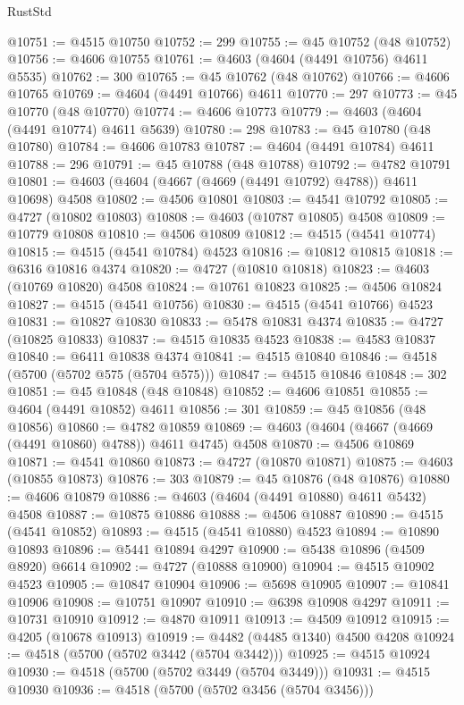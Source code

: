 \begin{lexlean}{RustStd}
\begin{coremodule}
@10751 := @4515 @10750
@10752 := 299
@10755 := @45 @10752 (@48 @10752)
@10756 := @4606 @10755
@10761 := @4603 (@4604 (@4491 @10756) @4611 @5535)
@10762 := 300
@10765 := @45 @10762 (@48 @10762)
@10766 := @4606 @10765
@10769 := @4604 (@4491 @10766) @4611
@10770 := 297
@10773 := @45 @10770 (@48 @10770)
@10774 := @4606 @10773
@10779 := @4603 (@4604 (@4491 @10774) @4611 @5639)
@10780 := 298
@10783 := @45 @10780 (@48 @10780)
@10784 := @4606 @10783
@10787 := @4604 (@4491 @10784) @4611
@10788 := 296
@10791 := @45 @10788 (@48 @10788)
@10792 := @4782 @10791
@10801 := @4603 (@4604 (@4667 (@4669 (@4491 @10792) @4788)) @4611 @10698) @4508
@10802 := @4506 @10801
@10803 := @4541 @10792
@10805 := @4727 (@10802 @10803)
@10808 := @4603 (@10787 @10805) @4508
@10809 := @10779 @10808
@10810 := @4506 @10809
@10812 := @4515 (@4541 @10774)
@10815 := @4515 (@4541 @10784) @4523
@10816 := @10812 @10815
@10818 := @6316 @10816 @4374
@10820 := @4727 (@10810 @10818)
@10823 := @4603 (@10769 @10820) @4508
@10824 := @10761 @10823
@10825 := @4506 @10824
@10827 := @4515 (@4541 @10756)
@10830 := @4515 (@4541 @10766) @4523
@10831 := @10827 @10830
@10833 := @5478 @10831 @4374
@10835 := @4727 (@10825 @10833)
@10837 := @4515 @10835 @4523
@10838 := @4583 @10837
@10840 := @6411 @10838 @4374
@10841 := @4515 @10840
@10846 := @4518 (@5700 (@5702 @575 (@5704 @575)))
@10847 := @4515 @10846
@10848 := 302
@10851 := @45 @10848 (@48 @10848)
@10852 := @4606 @10851
@10855 := @4604 (@4491 @10852) @4611
@10856 := 301
@10859 := @45 @10856 (@48 @10856)
@10860 := @4782 @10859
@10869 := @4603 (@4604 (@4667 (@4669 (@4491 @10860) @4788)) @4611 @4745) @4508
@10870 := @4506 @10869
@10871 := @4541 @10860
@10873 := @4727 (@10870 @10871)
@10875 := @4603 (@10855 @10873)
@10876 := 303
@10879 := @45 @10876 (@48 @10876)
@10880 := @4606 @10879
@10886 := @4603 (@4604 (@4491 @10880) @4611 @5432) @4508
@10887 := @10875 @10886
@10888 := @4506 @10887
@10890 := @4515 (@4541 @10852)
@10893 := @4515 (@4541 @10880) @4523
@10894 := @10890 @10893
@10896 := @5441 @10894 @4297
@10900 := @5438 @10896 (@4509 @8920) @6614
@10902 := @4727 (@10888 @10900)
@10904 := @4515 @10902 @4523
@10905 := @10847 @10904
@10906 := @5698 @10905
@10907 := @10841 @10906
@10908 := @10751 @10907
@10910 := @6398 @10908 @4297
@10911 := @10731 @10910
@10912 := @4870 @10911
@10913 := @4509 @10912
@10915 := @4205 (@10678 @10913)
@10919 := @4482 (@4485 @1340) @4500 @4208
@10924 := @4518 (@5700 (@5702 @3442 (@5704 @3442)))
@10925 := @4515 @10924
@10930 := @4518 (@5700 (@5702 @3449 (@5704 @3449)))
@10931 := @4515 @10930
@10936 := @4518 (@5700 (@5702 @3456 (@5704 @3456)))

\end{coremodule}
\end{lexlean}

